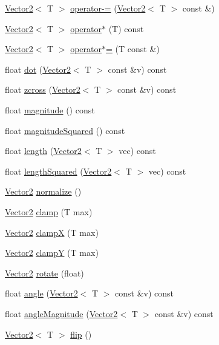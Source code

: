 \begin{DoxyCompactItemize}
\item 
\hyperlink{classVector2}{Vector2}$<$ T $>$ \hyperlink{classVector2_adf7a38a9d43c6830708057c30ddbf5f9}{operator-\/=} (\hyperlink{classVector2}{Vector2}$<$ T $>$ const \&)
\item 
\hyperlink{classVector2}{Vector2}$<$ T $>$ \hyperlink{classVector2_ad630c141ea4b5c348d1dbe90fd16af95}{operator$\ast$} (T) const 
\item 
\hyperlink{classVector2}{Vector2}$<$ T $>$ \hyperlink{classVector2_aff6f9727727cb72c696ae8408ee3175f}{operator$\ast$=} (T const \&)
\item 
float \hyperlink{classVector2_a9d13fbfc940b88cf117b90c7bcffeec5}{dot} (\hyperlink{classVector2}{Vector2}$<$ T $>$ const \&v) const 
\item 
float \hyperlink{classVector2_ada039a01838e14cf97b2f995f4748a61}{zcross} (\hyperlink{classVector2}{Vector2}$<$ T $>$ const \&v) const 
\item 
float \hyperlink{classVector2_a2ba2726deca326f6cf6f90cf96c6417b}{magnitude} () const 
\item 
float \hyperlink{classVector2_aca33fd3614fba0f29f6145642085879f}{magnitude\-Squared} () const 
\item 
float \hyperlink{classVector2_aa4deaff6744e5c52980c9543cde879c2}{length} (\hyperlink{classVector2}{Vector2}$<$ T $>$ vec) const 
\item 
float \hyperlink{classVector2_a6d33069838bf0cf4f068da4cc5d1784e}{length\-Squared} (\hyperlink{classVector2}{Vector2}$<$ T $>$ vec) const 
\item 
\hyperlink{classVector2}{Vector2} \hyperlink{classVector2_a8e5a913965bcd2725ca0960022874dcc}{normalize} ()
\item 
\hyperlink{classVector2}{Vector2} \hyperlink{classVector2_ad3ad9070482b89306e14e6cb127e1205}{clamp} (T max)
\item 
\hyperlink{classVector2}{Vector2} \hyperlink{classVector2_a3c6020b1331c100a2412f254fcdd44df}{clamp\-X} (T max)
\item 
\hyperlink{classVector2}{Vector2} \hyperlink{classVector2_a6cc7835e6bc56dd0fee04083640ff4b6}{clamp\-Y} (T max)
\item 
\hyperlink{classVector2}{Vector2} \hyperlink{classVector2_af02626f147b83492346921bfb44adeb4}{rotate} (float)
\item 
float \hyperlink{classVector2_a820da4470e33691b242bd69b162014b4}{angle} (\hyperlink{classVector2}{Vector2}$<$ T $>$ const \&v) const 
\item 
float \hyperlink{classVector2_aa481cb08d305491d9e3581946c94ceb4}{angle\-Magnitude} (\hyperlink{classVector2}{Vector2}$<$ T $>$ const \&v) const 
\item 
\hyperlink{classVector2}{Vector2}$<$ T $>$ \hyperlink{classVector2_a3447a814a110582b4c8b9944ce0d299e}{flip} ()
\end{DoxyCompactItemize}
